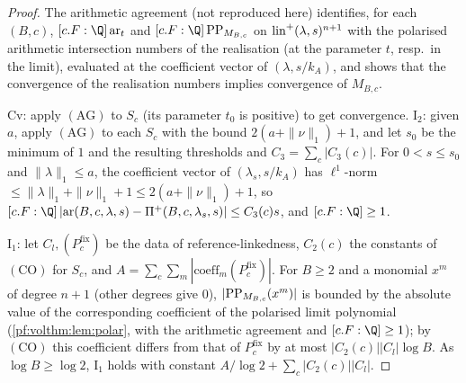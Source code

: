 \begin{proof}
The arithmetic agreement  (not reproduced here)
identifies, for each $(B,c)$, $[c.F:\Q]\,\mathrm{ar}_t$ and $[c.F:\Q]\,\volthmPP_{M_{B,c}}$ on
$\mathrm{lin}^+(\lambda,s)^{n+1}$ with the polarised arithmetic intersection numbers of the realisation (at the
parameter $t$, resp.\ in the limit), evaluated at the coefficient vector of $(\lambda,s/k_A)$, and shows that the
convergence of the realisation numbers implies convergence of $M_{B,c}$.

$\mathrm{Cv}$: apply $(\mathrm{AG})$ to $S_c$ (its parameter $t_0$ is positive) to get convergence. $\mathrm{I}_2$:
given $a$, apply $(\mathrm{AG})$ to each $S_c$ with the bound $2(a+\|\nu\|_1)+1$, and let $s_0$ be the minimum
of $1$ and the resulting thresholds and $C_3=\sum_c|C_3(c)|$. For $0<s\le s_0$ and $\|\lambda\|_1\le a$, the
coefficient vector of $(\lambda_s,s/k_A)$ has $\ell^1$-norm $\le\|\lambda\|_1+\|\nu\|_1+1\le2(a+\|\nu\|_1)+1$, so
$[c.F:\Q]\,|\mathrm{ar}(B,c,\lambda,s)-\Pi^+(B,c,\lambda_s,s)|\le C_3(c)s$, and $[c.F:\Q]\ge1$.

$\mathrm{I}_1$: let $C_l,(P^{\mathrm{fix}}_c)$ be the data of reference-linkedness, $C_2(c)$ the constants of
$(\mathrm{CO})$ for $S_c$, and $A=\sum_c\sum_m|\mathrm{coeff}_m(P^{\mathrm{fix}}_c)|$. For $B\ge2$ and a monomial
$x^m$ of degree $n+1$ (other degrees give $0$), $|\mathrm{PP}_{M_{B,c}}(x^m)|$ is bounded by the absolute value of the
corresponding coefficient of the polarised limit polynomial (\cref{pf:volthm:lem:polar}, with the arithmetic
agreement and $[c.F:\Q]\ge1$); by $(\mathrm{CO})$ this coefficient differs from that of
$P^{\mathrm{fix}}_c$ by at most $|C_2(c)||C_l|\log B$. As $\log B\ge\log2$, $\mathrm{I}_1$ holds with constant
$A/\log2+\sum_c|C_2(c)||C_l|$.
\end{proof}

